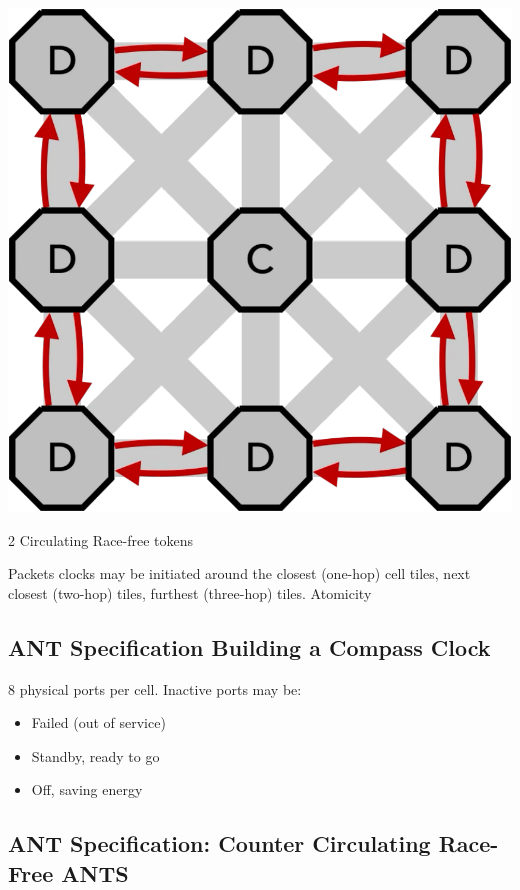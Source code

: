  \begin{marginfigure}
        \includegraphics[width=\linewidth,trim=0mm 0mm 0mm 0mm, clip]{../../FIGURES/3x3-bothways.pdf} %
  \caption{2 Circulating Race-free tokens }
    \vspace{10pt}
\end{marginfigure}

Packets clocks may be initiated around  the closest (one-hop) cell tiles, next closest (two-hop) tiles, furthest (three-hop) tiles. Atomicity 

\subsection{ANT Specification Building a Compass Clock}
8 physical ports per cell. 
Inactive ports may be:
\begin{itemize}
\item Failed (out of service)
\item Standby, ready to go
\item Off, saving energy
\end{itemize}

\subsection{ANT Specification: Counter Circulating Race-Free ANTS}


